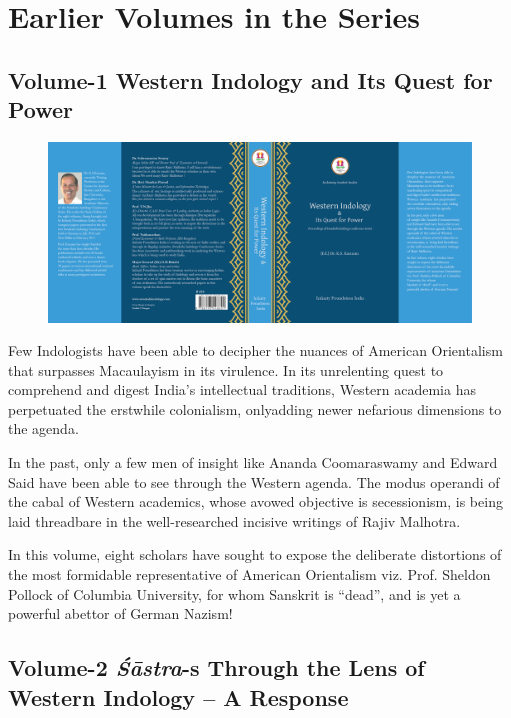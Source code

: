 
\chapter*{Earlier Volumes in the Series}\label{evc}

\section*{Volume-1 Western Indology and Its Quest for Power}

\begin{figure}[!htbp]
\includegraphics[scale=.727]{images/fig01.png}
\end{figure}

Few Indologists have been able to decipher the nuances of American Orientalism that surpasses Macaulayism in its virulence. In its unrelenting quest to comprehend and digest India’s intellectual traditions, Western academia has perpetuated the erstwhile colonialism, only\break adding newer nefarious dimensions to the agenda. 

In the past, only a few men of insight like Ananda Coomaraswamy and Edward Said have been able to see through the Western agenda. The modus operandi of the cabal of Western academics, whose avowed objective is secessionism, is being laid threadbare in the well-researched incisive writings of Rajiv Malhotra.

In this volume, eight scholars have sought to expose the deliberate distortions of the most formidable representative of American Orientalism viz. Prof. Sheldon Pollock of Columbia University, for whom Sanskrit is “dead”, and is yet a powerful abettor of German Nazism!


\section*{Volume-2 \textit{Śāstra}-s Through the Lens of Western Indology – A Response}


